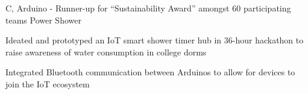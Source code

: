 \documentclass[12pt, letterpaper]{awesome-cv}
\begin{document}
\begin{cventries}
    \cventry
    {C, Arduino - Runner-up for “Sustainability Award” amongst 60 participating teams} %
    {Power Shower} %
    {} %
    {} %
    {
      \begin{cvitems} %
      	\item {Ideated and prototyped an IoT smart shower timer hub in 36-hour hackathon to raise awareness of water consumption in college dorms}
		\item {Integrated Bluetooth communication between Arduinos to allow for devices to join the IoT ecosystem}
      \end{cvitems}
    }
\end{cventries}

\end{document}
